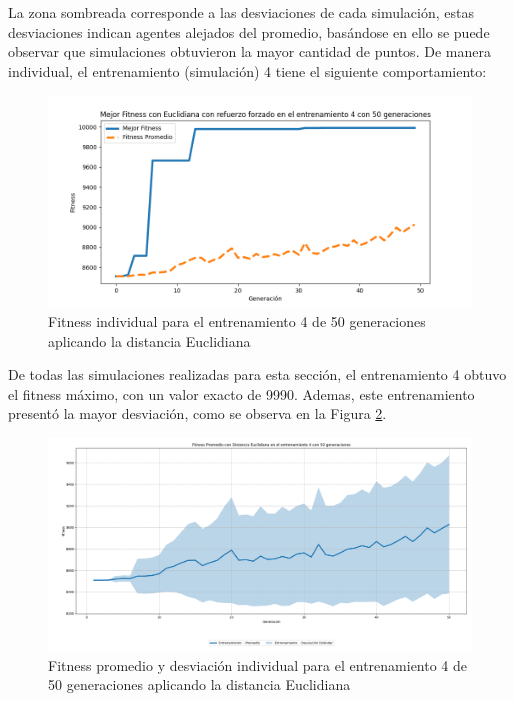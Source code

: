 \documentclass[conference]{IEEEtran}
\begin{document}
La zona sombreada corresponde a las desviaciones de cada simulación, estas desviaciones indican agentes alejados del promedio, basándose en ello se puede observar que simulaciones obtuvieron la mayor cantidad de puntos. De manera individual, el entrenamiento (simulación) 4 tiene el siguiente comportamiento:
\begin{figure}[H]
    \centering
    \includegraphics[width=0.9\linewidth]{Euclidiana/Fitnes_individual/Fitness_4_Eucli_50Gen.png}
    \caption{Fitness individual para el entrenamiento 4 de 50 generaciones aplicando la distancia Euclidiana}
    \label{fig:Fitnes_ecu_4_50_inv}
\end{figure}
De todas las simulaciones realizadas para esta sección, el entrenamiento 4 obtuvo el fitness máximo, con un valor exacto de 9990. Ademas, este entrenamiento presentó la mayor desviación, como se observa en la Figura \ref{fig:Fitnes_ecu_4_50_inv_sombra}.
\begin{figure}[H]
    \centering
    \includegraphics[width=0.9\linewidth]{Euclidiana/Fitnes_individual/Fitness_4_Eucli_50Gen_Sombra.png}
    \caption{Fitness promedio y desviación individual para el entrenamiento 4 de 50 generaciones aplicando la distancia Euclidiana}
    \label{fig:Fitnes_ecu_4_50_inv_sombra}
\end{figure}
\end{document}
